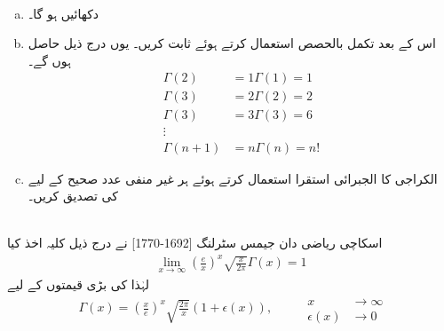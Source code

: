 \\
\begin{enumerate}[a.]
\item
دکھائیں  ہو گا۔
\item
اس کے بعد تکمل بالحصص استعمال کرتے ہوئے  ثابت کریں۔ یوں درج ذیل حاصل ہوں گے۔
\begin{align*}
\Gamma(2)&=1\Gamma(1)=1\\
\Gamma(3)&=2\Gamma(2)=2\\
\Gamma(3)&=3\Gamma(3)=6\\
\vdots&\\
\Gamma(n+1)&=n\Gamma(n)=n!
\end{align*}
\item
الکراجی کا الجبرائی  استقرا استعمال کرتے ہوئے ہر غیر منفی عدد صحیح  کے لیے  کی تصدیق کریں۔
\end{enumerate}
\\
اسکاچی ریاضی دان جیمس سٹرلنگ [1692-1770] نے  درج ذیل کلیہ اخذ کیا
\begin{align*}
\lim_{x\to\infty}(\tfrac{e}{x})^x\sqrt{\tfrac{x}{2\pi}}\Gamma(x)=1
\end{align*}
لہٰذا  کی بڑی قیمتوں کے لیے
\begin{gather}
\begin{aligned}\label{مساوات_تکمل_تراکیب_سٹرلنگ_ب}
\Gamma(x)=(\tfrac{x}{e})^x\sqrt{\tfrac{2\pi}{x}}(1+\epsilon(x)),
\end{aligned}\quad\quad
\begin{aligned}
x&\to \infty\\
\epsilon(x)&\to 0
\end{aligned}
\end{gather}

